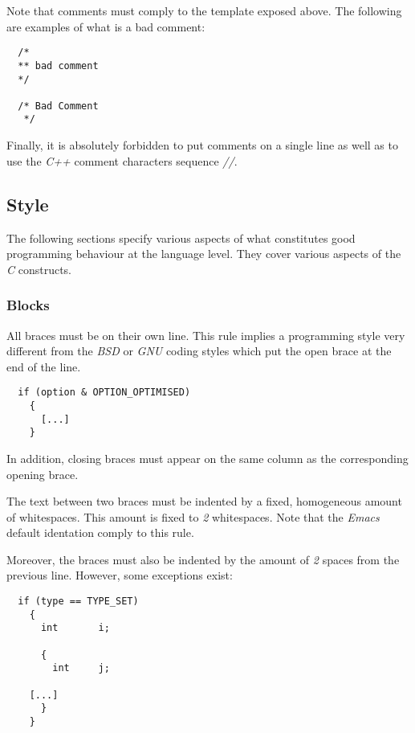 Note that comments must comply to the template exposed above. The following
are examples of what is a bad comment:

\begin{verbatim}
  /*
  ** bad comment
  */

  /* Bad Comment
   */
\end{verbatim}

Finally, it is absolutely forbidden to put comments on a single line
as well as to use the \textit{C++} comment characters sequence \textit{//}.

%
%

\subsection{Style}

The following sections specify various aspects of what constitutes good
programming behaviour at the language level. They cover various aspects
of the \textit{C} constructs.


\subsubsection{Blocks}

All braces must be on their own line. This rule implies a programming style
very different from the \textit{BSD} or \textit{GNU} coding styles which
put the open brace at the end of the line.

\begin{verbatim}
  if (option & OPTION_OPTIMISED)
    {
      [...]
    }
\end{verbatim}

In addition, closing braces must appear on the same column as the
corresponding opening brace.

The text between two braces must be indented by a fixed, homogeneous amount
of whitespaces. This amount is fixed to \textit{2} whitespaces. Note that
the \textit{Emacs} default identation comply to this rule.

Moreover, the braces must also be indented by the amount of \textit{2}
spaces from the previous line. However, some exceptions exist:

\begin{verbatim}
  if (type == TYPE_SET)
    {
      int       i;

      {
        int     j;

	[...]
      }
    }
\end{verbatim}

